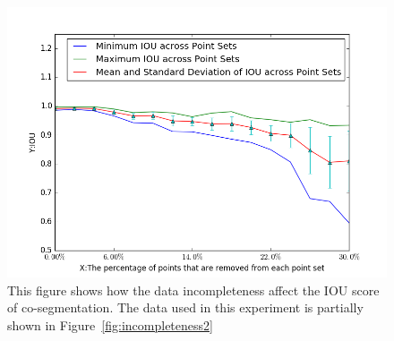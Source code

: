 \begin{figure}
	\centering
	\includegraphics[width=\linewidth]{images/incompleteness/IOU.png}
	\caption{This figure shows how the data incompleteness affect the IOU score of co-segmentation. The data used in this experiment is partially shown in Figure~\ref{fig:incompleteness2}}
	\label{fig:incompleteness}
\end{figure}

